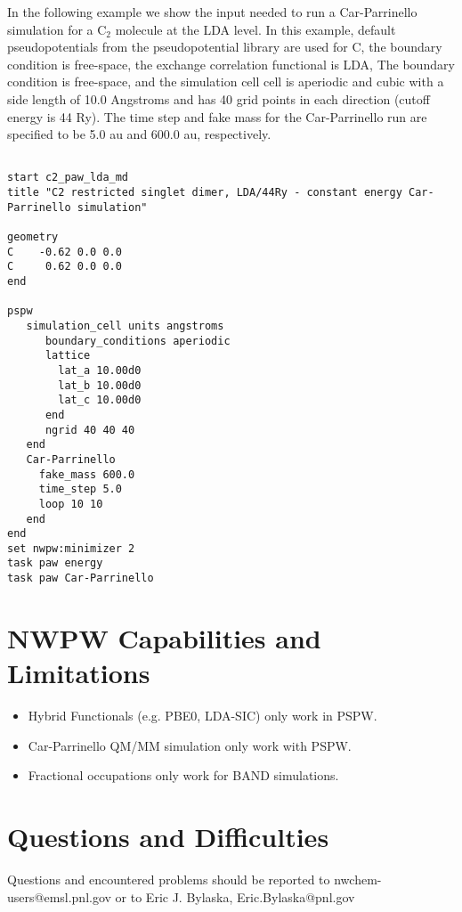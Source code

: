 In the following example we show the input needed to run a Car-Parrinello simulation
for a C$_2$ molecule at the LDA level.  In this example, default pseudopotentials
from the pseudopotential library are used for C, the boundary condition is free-space, 
the exchange correlation functional is LDA, The boundary condition is free-space, and 
the simulation cell cell is aperiodic and cubic with a side length of 10.0 Angstroms and has
40 grid points in each direction (cutoff energy is 44 Ry).  The time step and fake mass
for the Car-Parrinello run are specified to be 5.0 au and 600.0 au, respectively.  

\begin{verbatim}
         
start c2_paw_lda_md
title "C2 restricted singlet dimer, LDA/44Ry - constant energy Car-Parrinello simulation"

geometry  
C    -0.62 0.0 0.0
C     0.62 0.0 0.0
end
       
pspw
   simulation_cell units angstroms
      boundary_conditions aperiodic
      lattice
        lat_a 10.00d0
        lat_b 10.00d0
        lat_c 10.00d0
      end
      ngrid 40 40 40
   end
   Car-Parrinello
     fake_mass 600.0
     time_step 5.0
     loop 10 10
   end
end
set nwpw:minimizer 2
task paw energy
task paw Car-Parrinello
\end{verbatim}



\section{NWPW Capabilities and Limitations}
\label{sec:pspw_limits}
\normalsize

\begin{itemize}

\item Hybrid Functionals (e.g. PBE0, LDA-SIC) only work in PSPW.
\item Car-Parrinello QM/MM simulation only work with PSPW.
\item Fractional occupations only work for BAND simulations.
\end{itemize}


\section{Questions and Difficulties}
\normalsize

Questions and encountered problems should be reported to 
nwchem-users@emsl.pnl.gov 
or to Eric J. Bylaska, Eric.Bylaska@pnl.gov





